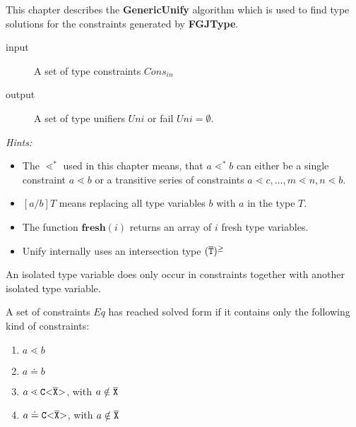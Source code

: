 \label{sec:unify}
This chapter describes the \textbf{GenericUnify} algorithm
which is used to find type solutions for the constraints generated by \textbf{FGJType}.

\begin{description}
\item[input] A set of type constraints $Cons_{in}$ %
\item[output] A set of type unifiers $Uni$
or fail $Uni = \emptyset$.
\end{description}

\textit{Hints:}
\begin{itemize}
\item The $\lessdot^*$ used in this chapter means,
that $a \lessdot^* b$ can either be a single constraint $a \lessdot b$ or a transitive series of constraints
$a \lessdot c, \ldots, m \lessdot n, n \lessdot b$.
\item $[a/b]T$ means replacing all type variables $b$ with $a$ in the type $T$.
\item The function $\textbf{fresh}(i)$ returns an array of $i$ fresh type variables.
\item Unify internally uses an intersection type $(\mathtt{\overline{\tt T} })^\geq$
\end{itemize}
\begin{definition} \label{def:isolated-type-variable}
    \textrm
  An isolated type variable does only occur in constraints together with another isolated type variable.
  \end{definition}
  
  \begin{definition}\label{def:solved-form}
    \textrm
    A set of constraints $Eq$ has reached solved form if it contains only the following kind of constraints:
    \begin{enumerate}
      \item $a \lessdot b$ %
      \item $a \doteq b$
      \item $a \lessdot \mathtt{C {\tt <} \overline{\tt X} {\tt >} }$, with $a \notin \overline{\tt X}$ %
      \item $a \doteq \mathtt{C {\tt <} \overline{\tt X} {\tt >} }$, with $a \notin \overline{\tt X}$
    \end{enumerate}
  \end{definition}  

